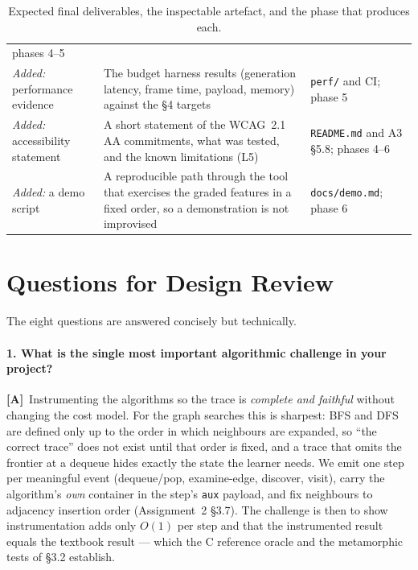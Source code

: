 \documentclass[11pt,a4paper]{article}
\newcommand{\A}{\textcolor{asmc}{\textbf{[A]}}}     %
\newcommand{\ct}[1]{\texttt{#1}}
\begin{document}
\begin{table}[H]
\begin{tabular}{@{}L{3.6cm}L{6.6cm}L{4.2cm}@{}}
phases 4--5 \\
\emph{Added:} performance evidence & The budget harness results (generation latency, frame
time, payload, memory) against the \S4 targets & \ct{perf/} and CI; phase 5 \\
\emph{Added:} accessibility statement & A short statement of the WCAG~2.1 AA commitments, what
was tested, and the known limitations (L5) & \ct{README.md} and A3 \S5.8; phases 4--6 \\
\emph{Added:} a demo script & A reproducible path through the tool that exercises the graded
features in a fixed order, so a demonstration is not improvised & \ct{docs/demo.md}; phase 6 \\
\bottomrule
\end{tabular}
\caption{Expected final deliverables, the inspectable artefact, and the phase that produces
each.}
\label{tab:deliverables}
\end{table}

\section{Questions for Design Review}

\noindent The eight questions are answered concisely but technically.

\paragraph{1. What is the single most important algorithmic challenge in your project?}
\A\ Instrumenting the algorithms so the trace is \emph{complete and faithful} without changing
the cost model. For the graph searches this is sharpest: BFS and DFS are defined only up to the
order in which neighbours are expanded, so ``the correct trace'' does not exist until that order
is fixed, and a trace that omits the frontier at a dequeue hides exactly the state the learner
needs. We emit one step per meaningful event (dequeue/pop, examine-edge, discover, visit), carry
the algorithm's \emph{own} container in the step's \ct{aux} payload, and fix neighbours to
adjacency insertion order (Assignment~2 \S3.7). The challenge is then to show instrumentation adds
only $O(1)$ per step and that the instrumented result equals the textbook result --- which the C
reference oracle and the metamorphic tests of \S3.2 establish.
\end{document}
